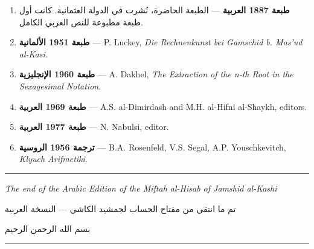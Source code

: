 \documentclass[11pt,a4paper,openany,oneside]{book}
\newcommand{\ar}[1]{{\arabicfont\beginR #1\endR}}
\newcommand{\shortline}{\noindent\rule{0.5\textwidth}{0.4pt}\par}
\begin{document}
\begin{enumerate}[label=\arabic*.]
  \item \textbf{\ar{طبعة 1887 العربية}} — \ar{الطبعة الحاضرة، نُشرت في الدولة العثمانية. كانت أول طبعة مطبوعة للنص العربي الكامل.}
  \item \textbf{\ar{طبعة 1951 الألمانية}} — P. Luckey, \textit{Die Rechnenkunst bei Gamschid b. Mas'ud al-Kasi}.
  \item \textbf{\ar{طبعة 1960 الإنجليزية}} — A. Dakhel, \textit{The Extraction of the n-th Root in the Sexagesimal Notation}.
  \item \textbf{\ar{طبعة 1969 العربية}} — A.S. al-Dimirdash and M.H. al-Hifni al-Shaykh, editors.
  \item \textbf{\ar{طبعة 1977 العربية}} — N. Nabulsi, editor.
  \item \textbf{\ar{ترجمة 1956 الروسية}} — B.A. Rosenfeld, V.S. Segal, A.P. Youschkevitch, \textit{Klyuch Arifmetiki}.
\end{enumerate}

\vspace{0.5cm}

\begin{center}
\shortline

\vspace{0.5cm}

\textit{The end of the Arabic Edition of the \textit{Miftah al-Hisab} of Jamshid al-Kashi}

\vspace{0.3cm}

\ar{تم ما انتقي من مفتاح الحساب لجمشيد الكاشي — النسخة العربية}

\vspace{0.3cm}

\ar{بسم الله الرحمن الرحيم}

\vspace{0.5cm}

\shortline
\end{center}
\end{document}
